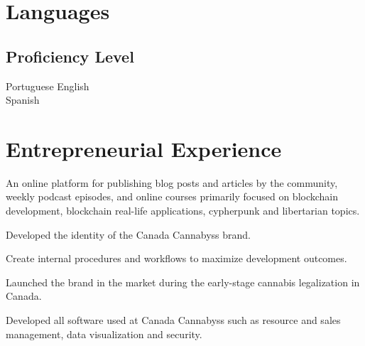 \documentclass[]{morris-resume-openfont}
\begin{document}
\begin{minipage}[t]{0.49\textwidth}
\section{Languages}
\subsection{Proficiency Level}
Portuguese \textbullet{} English \\
Spanish

%
%

\end{minipage} 
\hfill
\begin{minipage}[t]{0.5\textwidth} 


\section{Entrepreneurial Experience}

\vspace{\topsep} %
\begin{tightemize}
\item An online platform for publishing blog posts and articles by the community, weekly podcast episodes, and online courses primarily focused on blockchain development, blockchain real-life applications, cypherpunk and libertarian topics.
\end{tightemize}
\sectionsep

\begin{tightemize}
\item Developed the identity of the Canada Cannabyss brand.
\item Create internal procedures and workflows to maximize development outcomes. 
\item Launched the brand in the market during the early-stage cannabis legalization in Canada.
\item Developed all software used at Canada Cannabyss such as resource and sales management, data visualization and security.
\end{tightemize}
\sectionsep



\end{minipage}
\end{document}
